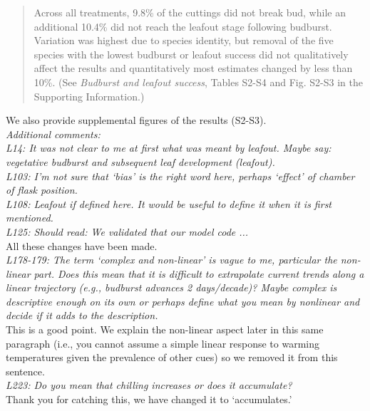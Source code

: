 \documentclass[11pt,a4paper]{article}
\begin{document}
\begin{quote}
Across all treatments, 9.8\% of the cuttings did not break bud, while an additional 10.4\% did not reach the leafout stage following budburst. Variation was highest due to species identity, but removal of the five species with the lowest  budburst or leafout success did not qualitatively affect the results and quantitatively most estimates changed by less than 10\%. (See \emph{Budburst and leafout success}, Tables S2-S4 and Fig. S2-S3 in the Supporting Information.)
\end{quote}

We also provide supplemental figures of the results (S2-S3). \\

\emph{Additional comments:\\
L14: It was not clear to me at first what was meant by leafout. Maybe say: vegetative
budburst and subsequent leaf development (leafout).\\
L103: I’m not sure that ‘bias’ is the right word here, perhaps ‘effect’ of chamber of flask
position.\\
L108: Leafout if defined here. It would be useful to define it when it is first mentioned.\\
L125:  Should read: We validated that our model code ...}\\

All these changes have been made.\\

\emph{L178-179: The term ‘complex and non-linear’ is vague to me, particular the non-linear part.
Does this mean that it is difficult to extrapolate current trends along a linear trajectory
(e.g., budburst advances 2 days/decade)?  Maybe complex is descriptive enough on its own or
perhaps define what you mean by nonlinear and decide if it adds to the description.}\\

This is a good point. We explain the non-linear aspect later in this same paragraph (i.e., you cannot assume a simple linear response to warming temperatures given the prevalence of other cues) so we removed it from this sentence.\\

\emph{L223: Do you mean that chilling increases or does it accumulate?}\\

Thank you for catching this, we have changed it to `accumulates.'  \\
\end{document}
